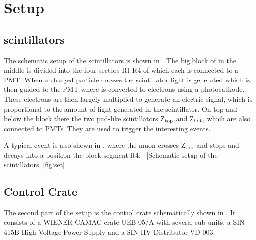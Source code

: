 \section{Setup}
\subsection{scintillators}
The schematic setup of the scintillators is shown in . The big block of in the middle is divided into the four sectors R1-R4 of which each is connected to a \ac{PMT}. When a charged particle crosses the scintillator light is generated which is then guided to the \ac{PMT} where is converted to electrons using a photocathode. These electrons are then largely multiplied to generate an electric signal, which is proportional to the amount of light generated in the scintillator. On top and below the block there the two pad-like scintillators Z$_{\text{top}}$ and Z$_{\text{bot}}$, which are also connected to \acp{PMT}. They are used to trigger the interesting events.\par
A typical event is also shown in , where the muon crosses Z$_{\text{top}}$ and stops and decays into a positron the block segment R4.
\
[Schematic setup of the scintillators.][fig:set]

\subsection{Control Crate}
The second part of the setup is the control crate schematically shown in . It consists of a WIENER CAMAC crate UEB 05/A with several sub-units, a SIN 415B High Voltage Power Supply and a SIN HV Distributor VD 003.
